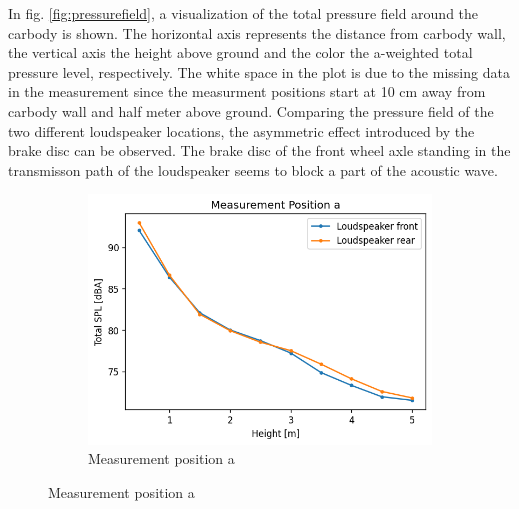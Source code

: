 In fig. \ref{fig:pressurefield}, a visualization of the total pressure field around the carbody is shown. The horizontal axis represents the distance from carbody wall, the vertical axis the height above ground and the color the a-weighted total pressure level, respectively.  The white space in the plot is due to the missing data in the measurement since the measurment positions start at 10 cm away from carbody wall and half meter above ground. Comparing the pressure field of the two different loudspeaker locations, the asymmetric effect introduced by the brake disc can be observed. The brake disc of the front wheel axle standing in the transmisson path of the loudspeaker seems to block a part of the acoustic wave.

\begin{figure}[H]
    \centering
     \begin{subfigure}[b]{0.6\textwidth}
        \centering
        \includegraphics[width=\linewidth]{fig/pressure_over_height_pos_a.png}
        \caption{Measurement position a}
        \label{fig:SPLoverheight_pos_a}
    \end{subfigure}


\end{figure}

